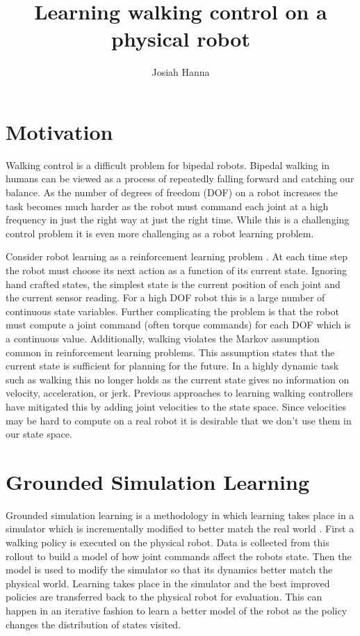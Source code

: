 \documentclass[12 pt]{article}
\title{Learning walking control on a physical robot}
\author{Josiah Hanna}
\date{}
\begin{document}
\maketitle

\section{Motivation}

Walking control is a difficult problem for bipedal robots. 
Bipedal walking in humans can be viewed as a process of repeatedly falling forward and catching our balance. 
As the number of degrees of freedom (DOF) on a robot increases the task becomes much harder as the robot must command each joint at a high frequency in just the right way at just the right time. 
While this is a challenging control problem it is even more challenging as a robot learning problem.

Consider robot learning as a reinforcement learning problem \cite{kober2013reinforcement}.
At each time step the robot must choose its next action as a function of its current state. 
Ignoring hand crafted states, the simplest state is the current position of each joint and the current sensor reading. 
For a high DOF robot this is a large number of continuous state variables.
Further complicating the problem is that the robot must compute a joint command (often torque commands) for each DOF which is a continuous value.
Additionally, walking violates the Markov assumption common in reinforcement learning problems.
This assumption states that the current state is sufficient for planning for the future.
In a highly dynamic task such as walking this no longer holds as the current state gives no information on velocity, acceleration, or jerk.
Previous approaches to learning walking controllers have mitigated this by adding joint velocities to the state space.
Since velocities may be hard to compute on a real robot it is desirable that we don't use them in our state space. 


\section{Grounded Simulation Learning}

Grounded simulation learning is a methodology in which learning takes place in a simulator which is incrementally modified to better match the real world \cite{farchy2013humanoid}.
First a walking policy is executed on the physical robot.
Data is collected from this rollout to build a model of how joint commands affect the robots state.
Then the model is used to modify the simulator so that its dynamics better match the physical world.
Learning takes place in the simulator and the best improved policies are transferred back to the physical robot for evaluation.
This can happen in an iterative fashion to learn a better model of the robot as the policy changes the distribution of states visited.
\end{document}
